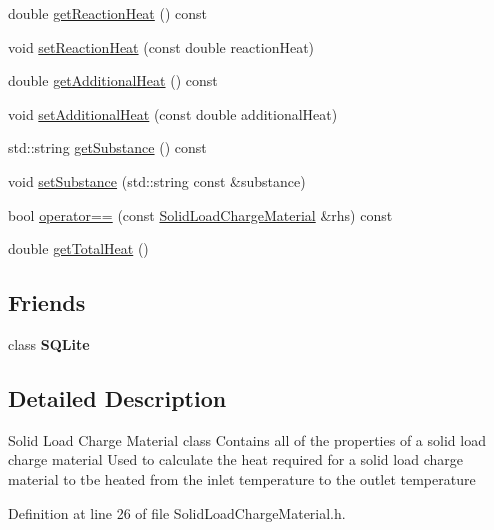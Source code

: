 \begin{DoxyCompactItemize}
double \hyperlink{class_solid_load_charge_material_a3481dc84063babc3514a4173e6bd9341}{get\+Reaction\+Heat} () const
\item 
void \hyperlink{class_solid_load_charge_material_a9c3cd28b2b31fb66eea984d9030cd247}{set\+Reaction\+Heat} (const double reaction\+Heat)
\item 
double \hyperlink{class_solid_load_charge_material_a0fde17a84b10bb75bf78227548fbf26c}{get\+Additional\+Heat} () const
\item 
void \hyperlink{class_solid_load_charge_material_a849fd29a3ecb95be2e9d34f9280b1b94}{set\+Additional\+Heat} (const double additional\+Heat)
\item 
std\+::string \hyperlink{class_solid_load_charge_material_ade525be6bb8cb86405daeb61d45311f9}{get\+Substance} () const
\item 
void \hyperlink{class_solid_load_charge_material_aebe376ab016f48678c3a70390b4ea52a}{set\+Substance} (std\+::string const \&substance)
\item 
bool \hyperlink{class_solid_load_charge_material_aacf2f41ce38067a52fb7d8456a05a699}{operator==} (const \hyperlink{class_solid_load_charge_material}{Solid\+Load\+Charge\+Material} \&rhs) const
\item 
double \hyperlink{class_solid_load_charge_material_af8593eb758c64236a8a026d6145584f4}{get\+Total\+Heat} ()
\end{DoxyCompactItemize}
\subsection*{Friends}
\begin{DoxyCompactItemize}
\item 
\mbox{\label{class_solid_load_charge_material_a0102f3b3c0cbf96db6c49f071fa5e7cc}} 
class {\bfseries S\+Q\+Lite}
\end{DoxyCompactItemize}


\subsection{Detailed Description}
Solid Load Charge Material class Contains all of the properties of a solid load charge material Used to calculate the heat required for a solid load charge material to tbe heated from the inlet temperature to the outlet temperature 

Definition at line 26 of file Solid\+Load\+Charge\+Material.\+h.



